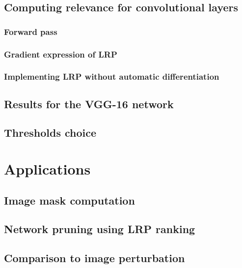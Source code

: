 \documentclass{../cs-classes/cs-classes}
\begin{document}
\subsection{Computing relevance for convolutional layers}
\subsubsection{Forward pass}
\subsubsection{Gradient expression of LRP}
\subsubsection{Implementing LRP without automatic differentiation}

\subsection{Results for the VGG-16 network}

\subsection{Thresholds choice}

\section{Applications}
\subsection{Image mask computation}
\subsection{Network pruning using LRP ranking}
\subsection{Comparison to image perturbation}

\newpage
\nocite{*}
\printbibliography
\end{document}
